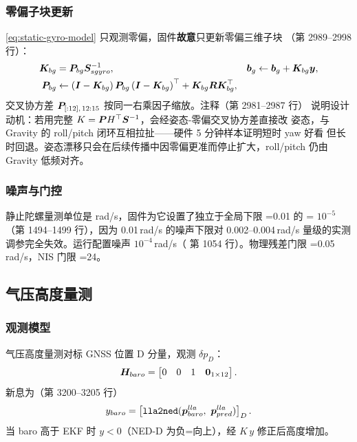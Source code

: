 \subsubsection{零偏子块更新}

\cref{eq:static-gyro-model} 只观测零偏，固件\textbf{故意}只更新零偏三维子块
（第 2989--2998 行）：
\begin{align}
  \boldsymbol{K}_{bg} &= \boldsymbol{P}_{bg}\boldsymbol{S}_{sgyro}^{-1}, &
  \boldsymbol{b}_g &\leftarrow \boldsymbol{b}_g + \boldsymbol{K}_{bg}\boldsymbol{y}, \label{eq:sg-bias-update} \\
  \boldsymbol{P}_{bg} &\leftarrow \left(\boldsymbol{I}-\boldsymbol{K}_{bg}\right)\boldsymbol{P}_{bg}
    \left(\boldsymbol{I}-\boldsymbol{K}_{bg}\right)^{\top} + \boldsymbol{K}_{bg}\boldsymbol{R}\boldsymbol{K}_{bg}^{\top},
  \label{eq:sg-cov-update}
\end{align}
交叉协方差 $\boldsymbol{P}_{[:12],\,12:15}$ 按同一右乘因子缩放。注释（第 2981--2987 行）
说明设计动机：若用完整 $K = \boldsymbol{P}H^{\top}\boldsymbol{S}^{-1}$，会经姿态-零偏交叉协方差直接改
姿态，与 Gravity 的 roll/pitch 闭环互相拉扯——硬件 5 分钟样本证明短时 yaw 好看
但长时回退。姿态漂移只会在后续传播中因零偏更准而停止扩大，roll/pitch 仍由
Gravity 低频对齐。

\subsubsection{噪声与门控}

静止陀螺量测单位是 rad/s，固件为它设置了独立于全局下限
=0.01 的 =
$10^{-5}$（第 1494--1499 行），因为 0.01\,rad/s 的噪声下限对
0.002--0.004\,rad/s 量级的实测调参完全失效。运行配置噪声
$10^{-4}$\,rad/s（ 第 1054 行）。物理残差门限
=0.05\,rad/s，NIS 门限
=24。

\subsection{气压高度量测}

\subsubsection{观测模型}

气压高度量测对标 GNSS 位置 D 分量，观测 $\delta p_D$：
\begin{equation}
  \boldsymbol{H}_{baro} = \begin{bmatrix} 0 & 0 & 1 & \boldsymbol{0}_{1\times12} \end{bmatrix}.
  \label{eq:H-baro}
\end{equation}
新息为（第 3200--3205 行）
\begin{equation}
  y_{baro} = \left[\code{lla2ned}(\vp{p}_{baro}^{lla},\ \vp{p}_{pred}^{lla})\right]_D.
  \label{eq:y-baro}
\end{equation}
当 baro 高于 EKF 时 $y<0$（NED-D 为负=向上），经 $K\,y$ 修正后高度增加。

